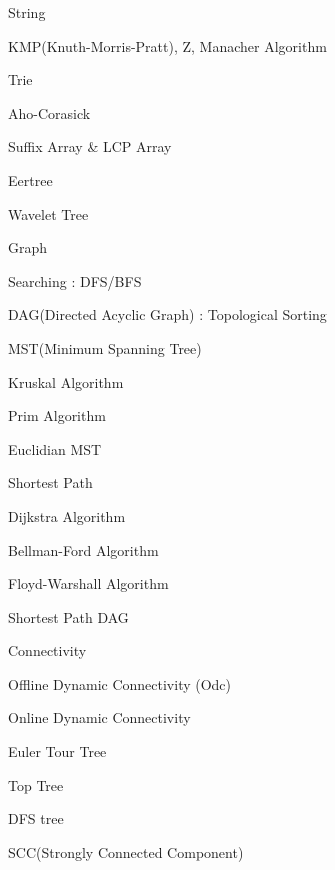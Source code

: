 \documentclass[landscape, 8pt, a4paper, oneside]{extarticle}
\begin{document}
\begin{multicols}{3}
\begin{tcolorbox}[breakable, enhanced, sharp corners, colback=white, colframe=black, boxrule=1pt, left=0pt]
\begin{IdeaNote}
\item String
    \begin{IdeaNote}
    \item KMP(Knuth-Morris-Pratt), Z, Manacher Algorithm
    \item Trie
    \item Aho-Corasick
    \item Suffix Array \& LCP Array
    \item Eertree
    \item Wavelet Tree
    \end{IdeaNote}

\item Graph
    \begin{IdeaNote}
    \item Searching : DFS/BFS
    \item DAG(Directed Acyclic Graph) : Topological Sorting
    \item MST(Minimum Spanning Tree)
        \begin{IdeaNote}
        \item Kruskal Algorithm
        \item Prim Algorithm
        \item Euclidian MST
        \end{IdeaNote}
    \item Shortest Path
        \begin{IdeaNote}
        \item Dijkstra Algorithm
        \item Bellman-Ford Algorithm
        \item Floyd-Warshall Algorithm
        \item Shortest Path DAG
        \end{IdeaNote}
    \item Connectivity
        \begin{IdeaNote}
        \item Offline Dynamic Connectivity (Odc)
        \item Online Dynamic Connectivity
            \begin{IdeaNote}
            \item Euler Tour Tree
            \item Top Tree
            \end{IdeaNote}
        \end{IdeaNote}
    \item DFS tree
        \begin{IdeaNote}
        \item SCC(Strongly Connected Component)

\end{IdeaNote}
\end{IdeaNote}
\end{IdeaNote}
\end{tcolorbox}
\end{multicols}
\end{document}
